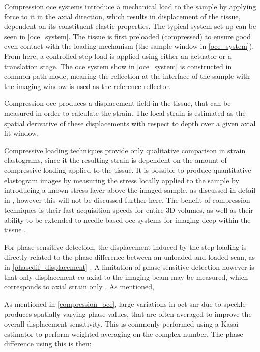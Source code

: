 Compression \ac{oce} systems introduce a mechanical load to the sample by applying force to it in the axial direction, which results in displacement of the tissue, dependent on its constituent elastic properties. The typical system set up can be seen in \autoref{oce_system}. The tissue is first preloaded (compressed) to ensure good even contact with the loading mechanism (the sample window in \autoref{oce_system}). From here, a controlled step-load is applied using either an actuator or a translation stage. The \ac{oce} system show in \autoref{oce_system} is constructed in common-path mode, meaning the reflection at the interface of the sample with the imaging window is used as the reference reflector. 

Compression \ac{oce} produces a displacement field in the tissue, that can be measured in order to calculate the strain. The local strain is estimated as the spatial derivative of these displacements with respect to depth \cite{kennedy_review_2014} over a given axial fit window. 

Compressive loading techniques provide only qualitative comparison in strain elastograms, since it the resulting strain is dependent on the amount of compressive loading applied to the tissue. It is possible to produce quantitative elastogram images by measuring the stress locally applied to the sample by introducing a known stress layer above the imaged sample, as discussed in detail in \cite{kennedy_quantitative_2015}, however this will not be discussed further here. The benefit of compression techniques is their fast acquisition speeds for entire 3D volumes, as well as their ability to be extended to needle based \ac{oce} systems for imaging deep within the tissue \cite{kennedy_review_2014}. 

For phase-sensitive detection, the displacement induced by the step-loading is directly related to the phase difference between an unloaded and loaded scan, as in \autoref{phasedif_displacement} \cite{kennedy_strain_2012}. A limitation of phase-sensitive detection however is that only displacement co-axial to the imaging beam may be measured, which corresponds to axial strain only \cite{wijesinghe_improving_2017}. As mentioned, 

As mentioned in \autoref{compression_oce}, large variations in \ac{oct} \ac{snr} due to speckle produces spatially varying phase values, that are often averaged to improve the overall displacement sensitivity. This is commonly performed using a Kasai estimator \cite{zaitsev_hybrid_2016} \cite{wijesinghe_improving_2017} to perform weighted averaging on the complex number. The phase difference using this is then:

